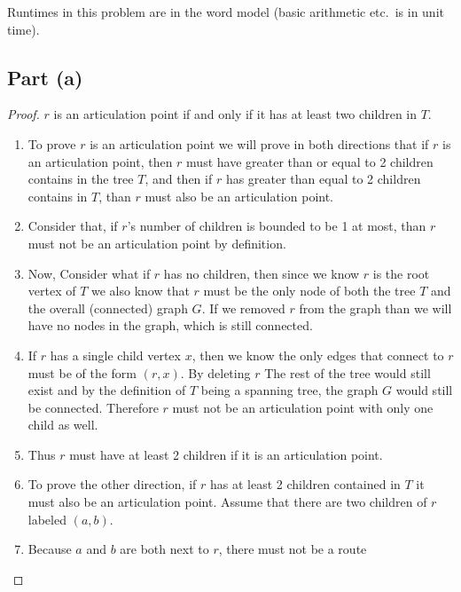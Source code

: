 \documentclass{article}
\begin{document}
Runtimes in this problem are in the word model (basic arithmetic etc.\ is in unit time).

\subsection{Part (a)}
\begin{proof} \(r\) is an articulation point if and only if it has at least two children
      in \(T\).
      \begin{enumerate}
            \item To prove \(r\) is an articulation point we will prove in both directions
                  that if \(r\) is an articulation point, then \(r\) must have greater than or
                  equal to 2 children contains in the tree \(T\), and then if \(r\) has greater
                  than equal to 2 children contains in \(T\), than \(r\) must also be an
                  articulation point.
            \item Consider that, if \(r\)'s number of children is bounded to be 1 at most,
                  than \(r\) must not be an articulation point by definition.
            \item Now, Consider what if \(r\) has no children, then since we know \(r\) is
                  the root vertex of \(T\) we also know that \(r\) must be the only node of both
                  the tree \(T\) and the overall (connected) graph \(G\). If we removed \(r\)
                  from the graph than we will have no nodes in the graph, which is still
                  connected.
            \item If \(r\) has a single child vertex \(x\), then we know the only edges
                  that connect to \(r\) must be of the form \((r,x)\). By deleting \(r\) The
                  rest of the tree would still exist and by the definition of \(T\) being a
                  spanning tree, the graph \(G\) would still be connected. Therefore \(r\) must
                  not be an articulation point with only one child as well.
            \item Thus \(r\) must have at least 2 children if it is an articulation point.
            \item To prove the other direction, if \(r\) has at least 2 children contained
                  in \(T\) it must also be an articulation point. Assume that there are two
                  children of \(r\) labeled \( (a,b) \).
            \item Because \(a\) and \(b\) are both next to \(r\), there must not be a route

\end{enumerate}
\end{proof}
\end{document}
